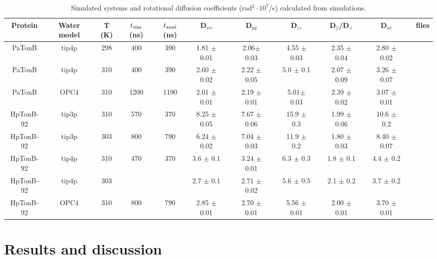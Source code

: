 \documentclass[pre,aps,floatfix,authordate1-4,twocolumn]{revtex4-1}
\begin{document}
\begin{table}[htb]
\centering
\caption{Simulated systems and rotational diffusion coefficients (rad$^2\cdot 10^7$/s) calculated from simulations.
}\label{ROTdiffCOEFFS}
\begin{tabular}{c c c c c c c c c c c c c c c c}
Protein     & Water model & T (K)  &  $t_{\rm sim}$ (ns)   &  $t_{\rm anal}$ (ns)   & D$_{xx}$ &&D$_{yy}$ &&D$_{zz}$ &&D$_{||}$/D$_+$ & &D$_{av}$& &files \\
\hline
PaTonB      & tip4p       & 298    & 400                 &  390                 & 1.81 $\pm$ 0.01 && 2.06$\pm$ 0.03 && 4.55 $\pm$ 0.03 && 2.35 $\pm$ 0.04 && 2.80 $\pm$ 0.02 && \cite{??} \\
PaTonB      & tip4p       & 310    & 400                 &  390                 &  2.60 $\pm$ 0.02 &&  2.22 $\pm$ 0.05& &  5.0  $\pm$ 0.1  & &  2.07 $\pm$ 0.09& &   3.26 $\pm$  0.07 && \cite{??}\\
PaTonB      & OPC4        & 310    & 1200                &  1190                &  2.01 $\pm$ 0.01 && 2.19 $\pm$ 0.01 && 5.01$\pm$ 0.03 && 2.39 $\pm$ 0.02 && 3.07 $\pm$ 0.01 && \cite{??}  \\
HpTonB-92   & tip3p       & 310    & 570           	 &  370                 & 8.25 $\pm$ 0.05 && 7.67 $\pm$ 0.06 && 15.9 $\pm$ 0.3 && 1.99 $\pm$ 0.06 &&  10.6 $\pm$ 0.2 &&  \cite{??} \\
HpTonB-92   & tip3p       & 303    & 800           	 &  790                 & 6.24 $\pm$ 0.02 && 7.04 $\pm$ 0.03 && 11.9 $\pm$ 0.2 && 1.80 $\pm$ 0.03 && 8.40 $\pm$ 0.07 && \cite{??} \\
HpTonB-92   & tip4p       & 310    & 470           	 &  370                 & 3.6 $\pm$ 0.1 && 3.24 $\pm$ 0.01 && 6.3 $\pm$ 0.3 && 1.8 $\pm$ 0.1 && 4.4 $\pm$ 0.2 && \cite{??} \\
HpTonB-92   & tip4p       & 303    &            	 &                      & 2.7 $\pm$ 0.1 && 2.71 $\pm$ 0.02 && 5.6 $\pm$ 0.5 && 2.1 $\pm$ 0.2 && 3.7 $\pm$ 0.2 && \cite{??} \\
HpTonB-92   & OPC4        & 310    & 800           	 &  790                 & 2.85 $\pm$ 0.01 && 2.70 $\pm$ 0.01 && 5.56 $\pm$ 0.01 && 2.00 $\pm$ 0.01 && 3.70 $\pm$ 0.01 && \cite{??} \\
\end{tabular}
\end{table}

\section{Results and discussion}
\end{document}

